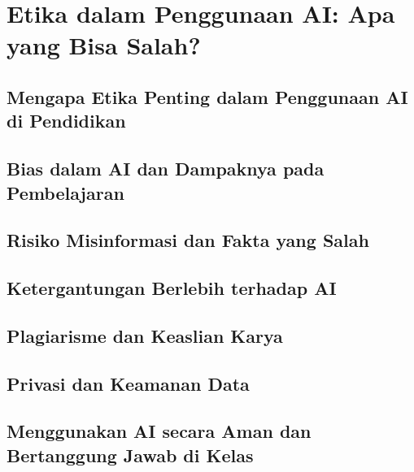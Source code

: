 \chapter{Etika dalam Penggunaan AI: Apa yang Bisa Salah?}

\section{Mengapa Etika Penting dalam Penggunaan AI di Pendidikan}

\section{Bias dalam AI dan Dampaknya pada Pembelajaran}

\section{Risiko Misinformasi dan Fakta yang Salah}

\section{Ketergantungan Berlebih terhadap AI}

\section{Plagiarisme dan Keaslian Karya}

\section{Privasi dan Keamanan Data}

\section{Menggunakan AI secara Aman dan Bertanggung Jawab di Kelas}

